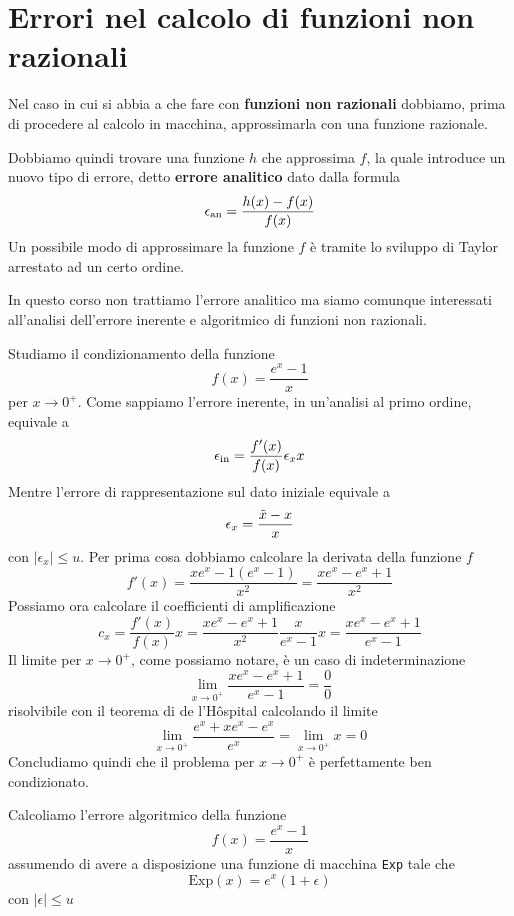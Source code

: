 \section{Errori nel calcolo di funzioni non razionali}
Nel caso in cui si abbia a che fare con \textbf{funzioni non razionali} dobbiamo, prima di procedere al
calcolo in macchina, approssimarla con una funzione razionale.

Dobbiamo quindi trovare una funzione $h$ che approssima $f$, la quale introduce un nuovo tipo di errore, detto
\textbf{errore analitico} dato dalla formula
\[ \epsilon_\text{an} = \frac{h(x) - f(x)}{f(x)} \]
Un possibile modo di approssimare la funzione $f$ è tramite lo sviluppo di Taylor arrestato ad un certo ordine.

In questo corso non trattiamo l'errore analitico ma siamo comunque interessati all'analisi dell'errore inerente
e algoritmico di funzioni non razionali.

\begin{example}
	Studiamo il condizionamento della funzione
	\[ f(x) = \frac{e^x - 1}{x} \]
	per $x \to 0^+$. Come sappiamo l'errore inerente, in un'analisi al primo ordine, equivale a
	\[ \epsilon_\text{in} = \frac{f'(x)}{f(x)} \epsilon_x x \]
	Mentre l'errore di rappresentazione sul dato iniziale equivale a
	\[ \epsilon_x = \frac{\tilde{x} - x}{x} \]
	con $|\epsilon_x| \leq u$. Per prima cosa dobbiamo calcolare la derivata della funzione $f$
	\[ f'(x) = \frac{x e^x - 1 (e^x - 1)}{x^2} = \frac{x e^x - e^x + 1}{x^2} \]
	Possiamo ora calcolare il coefficienti di amplificazione
	\[
		c_x = \frac{f'(x)}{f(x)} x =
		\frac{x e^x - e^x + 1}{x^2} \frac{x}{e^x - 1} x =
		\frac{x e^x - e^x + 1}{e^x - 1}
	\]
	Il limite per $x \to 0^+$, come possiamo notare, è un caso di indeterminazione
	\[ \lim_{x \to 0^+} \frac{x e^x - e^x + 1}{e^x - 1} = \frac{0}{0} \]
	risolvibile con il teorema di de l'H\^ospital calcolando il limite
	\[ \lim_{x \to 0^+} \frac{e^x + x e^x - e^x}{e^x} = \lim_{x \to 0^+} x = 0 \]
	Concludiamo quindi che il problema per $x \to 0^+$ è perfettamente ben condizionato.
\end{example}

\begin{example}
	Calcoliamo l'errore algoritmico della funzione
	\[ f(x) = \frac{e^x - 1}{x} \]
	assumendo di avere a disposizione una funzione di macchina \verb|Exp| tale che
	\[ \text{Exp} (x) = e^x (1 + \epsilon) \]
	con $|\epsilon| \leq u$
\end{example}